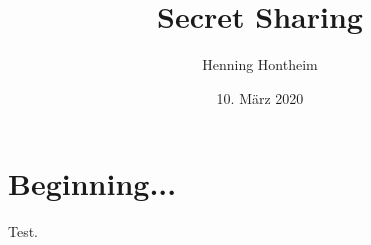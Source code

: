 \documentclass[12pt, a4paper, oneside, titlepage]{report}
\author{Henning Hontheim}
\title{Secret Sharing}
\date{10. März 2020}
\theoremstyle{definition}
\begin{document}
	\maketitle
	\tableofcontents
	
	\section{Beginning...}
	Test. \cite{buchmann}
	
	
\end{document}
